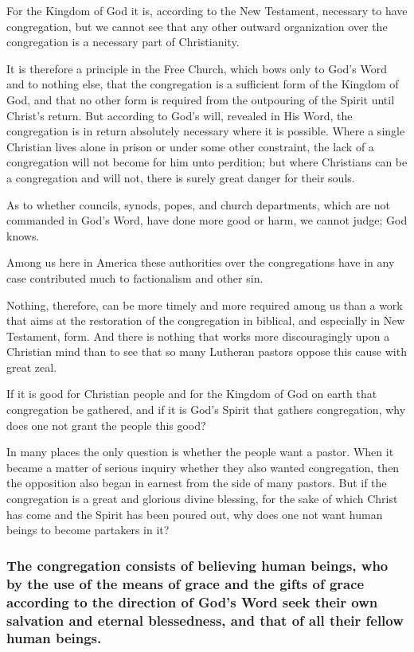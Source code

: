 For the Kingdom of God it is, according to the New Testament, necessary to have congregation, but we cannot see that any other outward organization over the congregation is a necessary part of Christianity.

It is therefore a principle in the Free Church, which bows only to God’s Word and to nothing else, that the congregation is a sufficient form of the Kingdom of God, and that no other form is required from the outpouring of the Spirit until Christ’s return. But according to God’s will, revealed in His Word, the congregation is in return absolutely necessary where it is possible. Where a single Christian lives alone in prison or under some other constraint, the lack of a congregation will not become for him unto perdition; but where Christians can be a congregation and will not, there is surely great danger for their souls.

As to whether councils, synods, popes, and church departments, which are not commanded in God’s Word, have done more good or harm, we cannot judge; God knows.

Among us here in America these authorities over the congregations have in any case contributed much to factionalism and other sin.

Nothing, therefore, can be more timely and more required among us than a work that aims at the restoration of the congregation in biblical, and especially in New Testament, form. And there is nothing that works more discouragingly upon a Christian mind than to see that so many Lutheran pastors oppose this cause with great zeal.

If it is good for Christian people and for the Kingdom of God on earth that congregation be gathered, and if it is God’s Spirit that gathers congregation, why does one not grant the people this good?

In many places the only question is whether the people want a pastor. When it became a matter of serious inquiry whether they also wanted congregation, then the opposition also began in earnest from the side of many pastors. But if the congregation is a great and glorious divine blessing, for the sake of which Christ has come and the Spirit has been poured out, why does one not want human beings to become partakers in it?





\subsubsection{The congregation consists of believing human beings, who by the use of the means of grace and the gifts of grace according to the direction of God’s Word seek their own salvation and eternal blessedness, and that of all their fellow human beings.}

